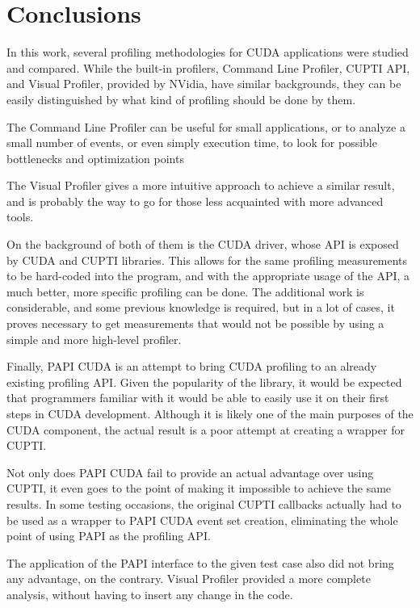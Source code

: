 \section{Conclusions}
\label{sec:anal}%

In this work, several profiling methodologies for CUDA applications were studied and compared. While the built-in profilers, Command Line Profiler, CUPTI API, and Visual Profiler, provided by NVidia, have similar backgrounds, they can be easily distinguished by what kind of profiling should be done by them.

The Command Line Profiler can be useful for small applications, or to analyze a small number of events, or even simply execution time, to look for possible bottlenecks and optimization points

The Visual Profiler gives a more intuitive approach to achieve a similar result, and is probably the way to go for those less acquainted with more advanced tools.

On the background of both of them is the CUDA driver, whose API is exposed by CUDA and CUPTI libraries. This allows for the same profiling measurements to be hard-coded into the program, and with the appropriate usage of the API, a much better, more specific profiling can be done. The additional work is considerable, and some previous knowledge is required, but in a lot of cases, it proves necessary to get measurements that would not be possible by using a simple and more high-level profiler.

Finally, PAPI CUDA is an attempt to bring CUDA profiling to an already existing profiling API. Given the popularity of the library, it would be expected that programmers familiar with it would be able to easily use it on their first steps in CUDA development. Although it is likely one of the main purposes of the CUDA component, the actual result is a poor attempt at creating a wrapper for CUPTI.

Not only does PAPI CUDA fail to provide an actual advantage over using CUPTI, it even goes to the point of making it impossible to achieve the same results. In some testing occasions, the original CUPTI callbacks actually had to be used as a wrapper to PAPI CUDA event set creation, eliminating the whole point of using PAPI as the profiling API.

The application of the PAPI interface to the given test case also did not bring any advantage, on the contrary. Visual Profiler provided a more complete analysis, without having to insert any change in the code.
